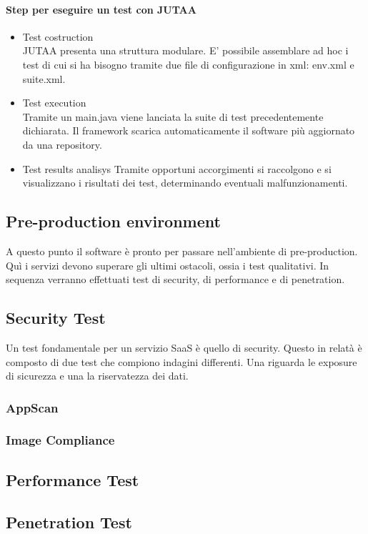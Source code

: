 \paragraph{Step per eseguire un test con JUTAA}
\begin{itemize}
	\item Test costruction \\
	JUTAA presenta una struttura modulare. E' possibile assemblare ad hoc i test di cui si ha bisogno tramite due file di configurazione in xml: env.xml e suite.xml. 
	\item Test execution\\
	Tramite un main.java viene lanciata la suite di test precedentemente dichiarata. Il framework scarica automaticamente il software più aggiornato da una repository.
	\item Test results analisys
	Tramite opportuni accorgimenti si raccolgono e si visualizzano i risultati dei test, determinando eventuali malfunzionamenti.
\end{itemize}
\subsection{Pre-production environment}
A questo punto il software è pronto per passare nell'ambiente di pre-production. Quì i servizi devono superare gli ultimi ostacoli, ossia i test qualitativi. In sequenza verranno effettuati test di security, di performance e di penetration.
\subsection{Security Test}
Un test fondamentale per un servizio SaaS è quello di security. Questo in relatà è composto di due test che compiono indagini differenti. Una riguarda le exposure di sicurezza e una la riservatezza dei dati.
\subsubsection{AppScan}
\subsubsection{Image Compliance}
\subsection{Performance Test}
\subsection{Penetration Test}
